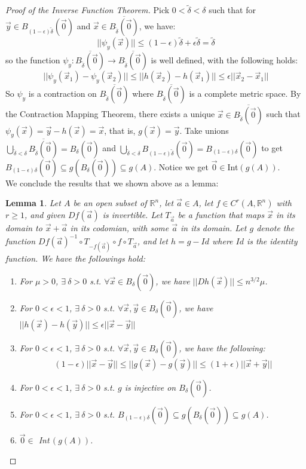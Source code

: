 \documentclass[15pt]{book}
\theoremstyle{break}
\theoremstyle{break}
\newtheorem{lem}{Lemma}[thm]
\newcommand{\R}{\mathbb{R}}
\begin{document}
\begin{proof}[Proof of the Inverse Function Theorem]
Pick $0 < \widetilde{\delta} < \delta$ such that for $\vec{y}\in B_{(1-\epsilon)\widetilde{\delta}}(\vec{0})$ and $\vec{x}\in \overline{B_{\widetilde{\delta}}(\vec{0})}$, we have: $$||\psi_y(\vec{x})|| \leq (1-\epsilon)\widetilde{\delta} + \epsilon\widetilde{\delta} = \widetilde{\delta}$$
so the function $\psi_y:\overline{B_{\widetilde{\delta}}(\vec{0})} \to \overline{B_{\widetilde{\delta}}(\vec{0})}$ is well defined, with the following holds:
$$||\psi_y(\vec{x}_1) - \psi_y(\vec{x}_2) || \leq ||h(\vec{x}_2)-h(\vec{x}_1)|| \leq \epsilon||\vec{x}_2-\vec{x}_1||$$
So $\psi_y$ is a contraction on $\overline{B_{\widetilde{\delta}}(\vec{0})}$ where $\overline{B_{\widetilde{\delta}}(\vec{0})}$ is a complete metric space. By the Contraction Mapping Theorem, there exists a unique $\vec{x}\in \overline{B_{\widetilde{\delta}}(\vec{0})}$ such that $\psi_y(\vec{x})= \vec{y}-h(\vec{x}) = \vec{x}$, that is, $g(\vec{x}) = \vec{y}$. Take unions $\bigcup_{\widetilde{\delta} < \delta}\overline{B_{\widetilde{\delta}}(\vec{0})} = B_\delta(\vec{0})$ and $\bigcup_{\widetilde{\delta} < \delta}B_{(1-\epsilon)\widetilde{\delta}}(\vec{0}) = B_{(1-\epsilon)\delta}(\vec{0})$ to get $B_{(1-\epsilon)\delta}(\vec{0}) \subseteq g(B_{\delta}(\vec{0}))\subseteq g(A)$. Notice we get $\vec{0} \in $Int$(g(A))$. \\

We conclude the results that we shown above as a lemma:

\begin{lem}
\setlength{\leftskip}{1cm} Let $A$ be an open subset of $\R^n$, let $\vec{a}\in A$, let $f\in C^r(A,\R^n)$ with $r\geq 1$, and given $Df(\vec{a})$ is invertible. Let $T_{\vec{a}}$ be a function that maps $\vec{x}$ in its domain to $\vec{x}+\vec{a}$ in its codomian, with some $\vec{a}$ in its domain. Let $g$ denote the function $Df(\vec{a})^{-1}\circ T_{-f(\vec{a})} \circ f\circ T_{\vec{a}}$, and let $h = g-Id$ where $Id$ is the identity function. We have the followings hold:
\begin{enumerate}[topsep=3pt,itemsep=-1ex,partopsep=1ex,parsep=1ex,leftmargin=1.5cm]
\item For $\mu>0$, $\exists\ \delta>0$ s.t. $\forall \vec{x}\in B_\delta(\vec{0})$, we have $||Dh(\vec{x})||\leq n^{3/2}\mu$.
\item For $0<\epsilon<1$, $\exists\ \delta>0$ s.t. $\forall \vec{x},\vec{y}\in B_\delta(\vec{0})$, we have $||h(\vec{x})-h(\vec{y})|| \leq \epsilon ||\vec{x}-\vec{y}||$
\item For $0<\epsilon<1$, $\exists\ \delta>0$ s.t. $\forall  \vec{x},\vec{y}\in B_\delta(\vec{0})$, we have the following: $$(1-\epsilon)||\vec{x}-\vec{y}|| \leq ||g(\vec{x})-g(\vec{y})|| \leq (1+\epsilon)||\vec{x}+\vec{y}||$$
\item For $0<\epsilon<1$, $\exists\ \delta>0$ s.t. $g$ is injective on $B_{\delta}(\vec{0})$.
\item For $0<\epsilon<1$, $\exists\ \delta>0$ s.t. $B_{(1-\epsilon)\delta}(\vec{0}) \subseteq g(B_{\delta}(\vec{0}))\subseteq g(A)$.
\item $\vec{0}\in $ Int\,$(g(A))$.
\end{enumerate}
\end{lem}


\end{proof}
\end{document}
